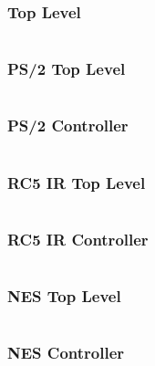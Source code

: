\documentclass[12pt]{article}
\begin{document}
\subsubsection{Top Level}

\inputminted[breaklines, fontfamily=tt, fontsize=\small, frame=lines, framesep=1.5em, linenos, numbersep=1.5em, style=vs]{systemverilog}{../src/top_level.sv}

\subsubsection{PS/2 Top Level}

\inputminted[breaklines, fontfamily=tt, fontsize=\small, frame=lines, framesep=1.5em, linenos, numbersep=1.5em, style=vs]{systemverilog}{../src/ps2_top_level.sv}

\subsubsection{PS/2 Controller}

\inputminted[breaklines, fontfamily=tt, fontsize=\small, frame=lines, framesep=1.5em, linenos, numbersep=1.5em, style=vs]{systemverilog}{../src/ps2.sv}

\subsubsection{RC5 IR Top Level}

\inputminted[breaklines, fontfamily=tt, fontsize=\small, frame=lines, framesep=1.5em, linenos, numbersep=1.5em, style=vs]{systemverilog}{../src/ir_top_level.sv}

\subsubsection{RC5 IR Controller}

\inputminted[breaklines, fontfamily=tt, fontsize=\small, frame=lines, framesep=1.5em, linenos, numbersep=1.5em, style=vs]{systemverilog}{../src/ir.sv}

\subsubsection{NES Top Level}

\inputminted[breaklines, fontfamily=tt, fontsize=\small, frame=lines, framesep=1.5em, linenos, numbersep=1.5em, style=vs]{systemverilog}{../src/nes_top_level.sv}

\subsubsection{NES Controller}
\end{document}
